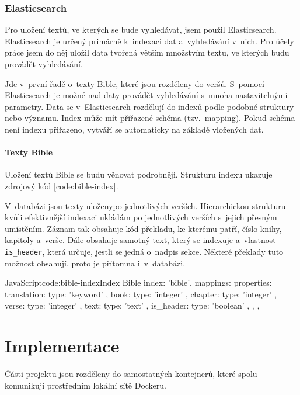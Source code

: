 \documentclass[
  tables=false,
  glossaries,
  index
]{kidiplom}
\begin{document}
\subsubsection{Elasticsearch}
Pro uložení textů, ve kterých se bude vyhledávat, jsem použil Elasticsearch. Elasticsearch je určený primárně k~indexaci dat a~vyhledávání v~nich. Pro účely práce jsem do něj uložil data tvořená větším množstvím textu, ve kterých budu provádět vyhledávání.

Jde v~první řadě o~texty Bible, které jsou rozděleny do veršů. S~pomocí Elasticsearch je možné nad daty provádět vyhledávání s~mnoha nastavitelnými parametry. Data se v~Elasticsearch rozdělují do indexů podle podobné struktury nebo významu. Index může mít přiřazené schéma (tzv.~mapping). Pokud schéma není indexu přiřazeno, vytváří se automaticky na základě vložených dat.

\paragraph{Texty Bible}
Uložení textů Bible se budu věnovat podrobněji. Strukturu indexu ukazuje zdrojový kód \ref{code:bible-index}.

V~databázi jsou texty uloženypo jednotlivých verších. Hierarchickou strukturu kvůli efektivnější indexaci ukládám po jednotlivých verších s~jejich přesným umístěním. Záznam tak obsahuje kód překladu, ke kterému patří, číslo knihy, kapitoly a~verše. Dále obsahuje samotný text, který se indexuje a~vlastnost \texttt{is\_header}, která určuje, jestli se jedná o~nadpis sekce. Některé překlady tuto možnost obsahují, proto je přítomna i~v~databázi.

\begin{kicode}{JavaScript}{code:bible-index}{Index Bible}
	{
    	index: 'bible',
    	mappings: {
           	properties: {
               	translation: { type: 'keyword' },
               	book: { type: 'integer' },
               	chapter: { type: 'integer' },
               	verse: { type: 'integer' },
               	text: { type: 'text' },
               	is_header: { type: 'boolean' },
            },
        },
	}
\end{kicode}

\section{Implementace}
Části projektu jsou rozděleny do samostatných kontejnerů, které spolu komunikují prostředním lokální sítě Dockeru.
\end{document}
